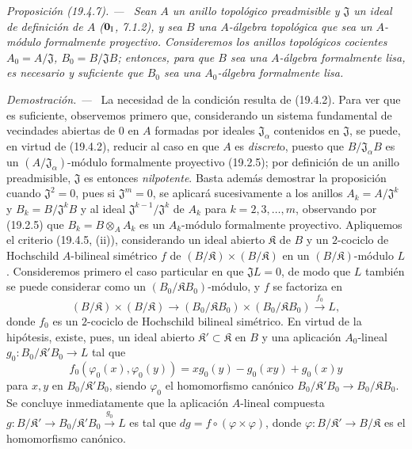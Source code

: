 \documentclass[10pt,oneside]{book}
\makeatletter
\newcommand{\setmanualcurrentlabel}[1]{\def\@currentlabel{#1}}
\newcommand{\oldpage}[2][]{%
  \setcounter{footnote}{0}%
  \marginpar{\scriptsize\textbf{#1}~|~#2}\ignorespaces}
\newenvironment{proposition}[1][]{%
  \setmanualcurrentlabel{#1}\par\medskip\noindent\itshape Proposición (#1). ---\ }{\par}
\newenvironment{proof}{%
  \par\medskip\noindent\textit{Demostración. ---\ }}{\par}
\providecommand{\setmin}{-}%
\makeatother
\begin{document}
\begin{proposition}[19.4.7]
\label{0.19.4.7-es}
Sean $A$ un anillo topológico preadmisible y $\mathfrak J$ un ideal de
definición de $A$ \textup{($\mathbf 0_{\rm I}$, 7.1.2)}, y sea $B$ una $A$-álgebra
topológica que sea un $A$-módulo formalmente proyectivo. Consideremos los
anillos topológicos cocientes $A_0=A/\mathfrak J$,
$B_0=B/\mathfrak JB$; entonces, para que $B$ sea una $A$-álgebra formalmente
lisa, es necesario y suficiente que $B_0$ sea una $A_0$-álgebra formalmente
lisa.
\end{proposition}

\oldpage[0\textsubscript{IV-1}]{89}

\begin{proof}
La necesidad de la condición resulta de (19.4.2). Para ver que es
suficiente, observemos primero que, considerando un sistema fundamental de
vecindades abiertas de $0$ en $A$ formadas por ideales
$\mathfrak J_\alpha$ contenidos en $\mathfrak J$, se puede, en virtud de
(19.4.2), reducir al caso en que $A$ es \emph{discret}o, puesto que
$B/\mathfrak J_\alpha B$ es un
$(A/\mathfrak J_\alpha)$-módulo formalmente proyectivo (19.2.5); por
definición de un anillo preadmisible, $\mathfrak J$ es entonces
\emph{nilpotente}. Basta además demostrar la proposición cuando
$\mathfrak J^2=0$, pues si $\mathfrak J^m=0$, se aplicará sucesivamente
a los anillos $A_k=A/\mathfrak J^k$ y $B_k=B/\mathfrak J^kB$ y al ideal
$\mathfrak J^{k-1}/\mathfrak J^k$ de $A_k$ para $k=2,3,\ldots,m$,
observando por (19.2.5) que $B_k=B\otimes_A A_k$ es un $A_k$-módulo formalmente
proyectivo. Apliquemos el criterio (19.4.5, (ii)), considerando un ideal abierto
$\mathfrak K$ de $B$ y un $2$-cociclo de Hochschild $A$-bilineal
simétrico $f$ de $(B/\mathfrak K)\times(B/\mathfrak K)$ en un
$(B/\mathfrak K)$-módulo $L$. Consideremos primero el caso particular en que
$\mathfrak JL=0$, de modo que $L$ también se puede considerar como un
$(B_0/\mathfrak KB_0)$-módulo, y $f$ se factoriza en
\[
  (B/\mathfrak K)\times(B/\mathfrak K)\to
  (B_0/\mathfrak KB_0)\times(B_0/\mathfrak KB_0)
  \xrightarrow{f_0}L,
\]
donde $f_0$ es un $2$-cociclo de Hochschild bilineal simétrico. En virtud de
la hipótesis, existe, pues, un ideal abierto
$\mathfrak K'\subset\mathfrak K$ en $B$ y una aplicación
$A_0$-lineal $g_0:B_0/\mathfrak K'B_0\to L$ tal que
\[
  f_0(\varphi_0(x),\varphi_0(y))
  =xg_0(y)\setmin g_0(xy)+g_0(x)y
\]
para $x,y$ en $B_0/\mathfrak K'B_0$, siendo $\varphi_0$
el homomorfismo canónico
$B_0/\mathfrak K'B_0\to B_0/\mathfrak KB_0$. Se concluye inmediatamente que
la aplicación $A$-lineal compuesta
$g:B/\mathfrak K'\to B_0/\mathfrak K'B_0\xrightarrow{g_0}L$ es tal
que $dg=f\circ(\varphi\times\varphi)$, donde
$\varphi:B/\mathfrak K'\to B/\mathfrak K$ es el homomorfismo
canónico.


\end{proof}
\end{document}
